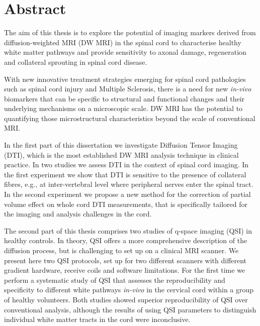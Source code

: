 

\begingroup
\let\clearpage\relax
\let\cleardoublepage\relax
\let\cleardoublepage\relax

\chapter*{Abstract} %
{\small
The aim of this thesis is to explore the potential of imaging markers derived from diffusion-weighted MRI (DW MRI) in the spinal cord to characterise healthy white matter pathways and provide sensitivity to axonal damage, regeneration and collateral sprouting in spinal cord disease. 


With new innovative treatment strategies emerging for spinal cord pathologies such as spinal cord injury and Multiple Sclerosis, there is a need for new \emph{in-vivo} biomarkers that can be specific to structural and functional changes and their underlying mechanisms on a microscopic scale. DW MRI has the potential to quantifying those microstructural characteristics beyond the scale of  conventional MRI.


In the first part of this dissertation we investigate Diffusion Tensor Imaging (DTI), which is the most established DW MRI analysis technique in clinical practice. In two studies we assess DTI in the context of spinal cord imaging. In the first experiment we show that DTI is sensitive to the presence of collateral fibres, e.g., at inter-vertebral level where peripheral nerves enter the spinal tract. In the second experiment we propose a new method for the correction of partial volume effect on whole cord DTI measurements, that is specifically tailored for the imaging and analysis challenges in the cord. 


The second part of this thesis comprises two studies of q-space imaging (QSI) in healthy controls. In theory, QSI offers a more comprehensive description of the diffusion process, but is challenging to set up on a clinical MRI scanner. We present here two QSI protocols, set up for two different scanners with different gradient hardware, receive coils and software limitations. For the first time we perform a systematic study of QSI that assesses the reproducibility and specificity to different white pathways \emph{in-vivo} in the cervical cord within a group of healthy volunteers. Both studies showed superior reproducibility of QSI over conventional analysis, although the results of using QSI parameters to distinguish individual white matter tracts in the cord were inconclusive.


}
